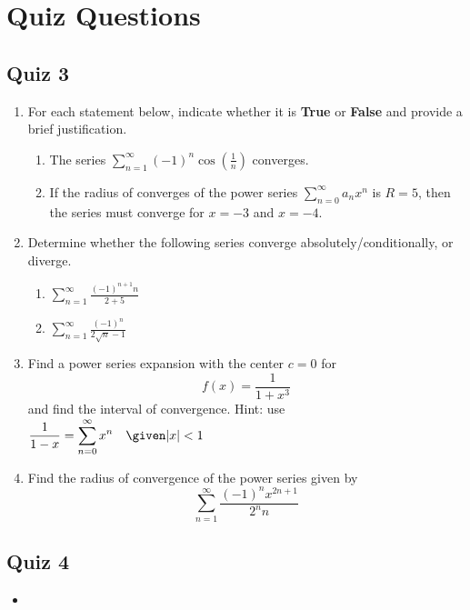 \chapter{Quiz Questions}

\section{Quiz 3}
\begin{enumerate}
  \item For each statement below, indicate whether it is \textbf{True} or
    \textbf{False} and provide a brief justification.

  \begin{enumerate}[itemsep=24em]
    \item The series \(\displaystyle \sum_{n=1}^{\infty} (-1)^n \cos
      \left(\frac{1}{n}\right) \) converges.

    \item If the radius of converges of the power series \(\displaystyle
      \sum_{n=0}^{\infty} a_nx^n \) is \(R=5\), then the series must converge
      for \(x = -3\) and \(x = -4\).
  \end{enumerate}

\newpage %
  \item Determine whether the following series converge absolutely/conditionally, or diverge.
    \begin{enumerate}[itemsep=24em]
      \item \(\displaystyle \sum_{n=1}^{\infty} \frac{(-1)^{n+1}n }{2+5}\)

      \item \(\displaystyle \sum_{n=1}^{\infty} \frac{(-1)^n}{2\sqrt{n} - 1} \)
    \end{enumerate}

\newpage %

  \item Find a power series expansion with the center \(c = 0 \) for
     \[%
     f(x) = \frac{1}{1+x^3}
     \]%
     and find the interval of convergence. Hint: use \(\displaystyle \frac{1}{1-x} = \sum_{n=0}^{\infty} x^n \quad \given |x| < 1 \)

  \vspace{18em}

  \item Find the radius of convergence of the power series given by
    \[%
    \sum_{n=1}^{\infty} \frac{(-1)^n x^{2n+1} }{2^n n}
    \]%

\end{enumerate}

\section{Quiz 4}
\begin{itemize}
  \item
\end{itemize}
